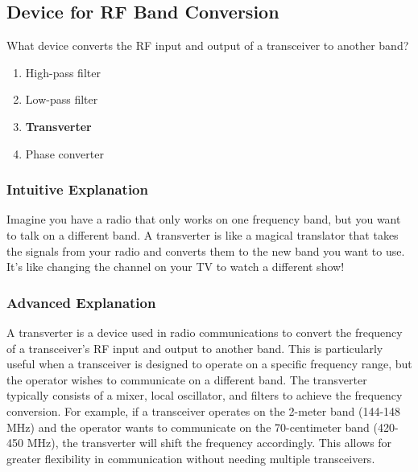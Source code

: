 \subsection{Device for RF Band Conversion}
\label{T7A06}

\begin{tcolorbox}[colback=gray!10!white,colframe=black!75!black,title=T7A06]
What device converts the RF input and output of a transceiver to another band?
\begin{enumerate}[noitemsep]
    \item High-pass filter
    \item Low-pass filter
    \item \textbf{Transverter}
    \item Phase converter
\end{enumerate}
\end{tcolorbox}

\subsubsection*{Intuitive Explanation}
Imagine you have a radio that only works on one frequency band, but you want to talk on a different band. A transverter is like a magical translator that takes the signals from your radio and converts them to the new band you want to use. It’s like changing the channel on your TV to watch a different show!

\subsubsection*{Advanced Explanation}
A transverter is a device used in radio communications to convert the frequency of a transceiver's RF input and output to another band. This is particularly useful when a transceiver is designed to operate on a specific frequency range, but the operator wishes to communicate on a different band. The transverter typically consists of a mixer, local oscillator, and filters to achieve the frequency conversion. For example, if a transceiver operates on the 2-meter band (144-148 MHz) and the operator wants to communicate on the 70-centimeter band (420-450 MHz), the transverter will shift the frequency accordingly. This allows for greater flexibility in communication without needing multiple transceivers.
